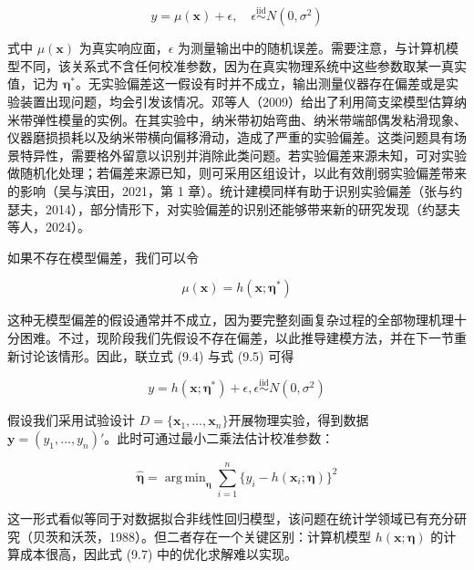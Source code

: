 \documentclass{ctexart}
\DeclareMathOperator*{\argmin}{arg\,min}
\begin{document}
\begin{equation*}
y=\mu(\boldsymbol{x})+\epsilon,\quad\epsilon\stackrel{\text{iid}}{\sim}N(0,\sigma^2)
\tag{9.4}
\end{equation*}

式中 $\mu(\boldsymbol{x})$ 为真实响应面，$\epsilon$ 为测量输出中的随机误差。需要注意，与计算机模型不同，该关系式不含任何校准参数，因为在真实物理系统中这些参数取某一真实值，记为 $\boldsymbol{\eta}^*$。无实验偏差这一假设有时并不成立，输出测量仪器存在偏差或是实验装置出现问题，均会引发该情况。邓等人（2009）给出了利用简支梁模型估算纳米带弹性模量的实例。在其实验中，纳米带初始弯曲、纳米带端部偶发粘滑现象、仪器磨损损耗以及纳米带横向偏移滑动，造成了严重的实验偏差。这类问题具有场景特异性，需要格外留意以识别并消除此类问题。若实验偏差来源未知，可对实验做随机化处理；若偏差来源已知，则可采用区组设计，以此有效削弱实验偏差带来的影响（吴与滨田，2021，第 1 章）。统计建模同样有助于识别实验偏差（张与约瑟夫，2014），部分情形下，对实验偏差的识别还能够带来新的研究发现（约瑟夫等人，2024）。

如果不存在模型偏差，我们可以令

\begin{equation*}
\mu(\boldsymbol{x})=h(\boldsymbol{x};\boldsymbol{\eta}^*)
\tag{9.5}
\end{equation*}

这种无模型偏差的假设通常并不成立，因为要完整刻画复杂过程的全部物理机理十分困难。不过，现阶段我们先假设不存在偏差，以此推导建模方法，并在下一节重新讨论该情形。因此，联立式 (9.4) 与式 (9.5) 可得

\begin{equation*}
y=h(\boldsymbol{x};\boldsymbol{\eta}^*)+\epsilon,\epsilon\overset{\text{iid}}{\sim}N(0,\sigma^{2})
\tag{9.6}
\end{equation*}


假设我们采用试验设计 $D=\{\boldsymbol{x}_1,\dots,\boldsymbol{x}_n\} $开展物理实验，得到数据 $\boldsymbol{y}=(y_1,\dots,y_n)'$。此时可通过最小二乘法估计校准参数：

\begin{equation*}
\widehat{\boldsymbol{\eta}}=\argmin_{\boldsymbol{\eta}}\sum_{i=1}^{n}\{y_i-h(\boldsymbol{x}_i;\boldsymbol{\eta})\}^2
\tag{9.7}
\end{equation*}

这一形式看似等同于对数据拟合非线性回归模型，该问题在统计学领域已有充分研究（贝茨和沃茨，1988）。但二者存在一个关键区别：计算机模型 $h(\boldsymbol{x};\boldsymbol{\eta})$ 的计算成本很高，因此式 (9.7) 中的优化求解难以实现。
\end{document}
